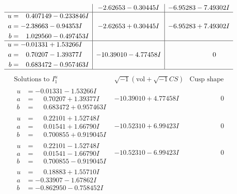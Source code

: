 \documentclass[1p]{elsarticle_modified}
\theoremstyle{definition}
\newcommand{\I}{\sqrt{-1}}
\begin{document}
$$\begin{array}{c|c|c}
 & -2.62653 - 0.30445 I & -6.95283 - 7.49302 I \\ \hline\begin{aligned}
u &= \phantom{-}0.407149 - 0.233846 I \\
a &= -2.38663 - 0.94353 I \\
b &= \phantom{-}1.029560 - 0.497453 I\end{aligned}
 & -2.62653 + 0.30445 I & -6.95283 + 7.49302 I \\ \hline\begin{aligned}
u &= -0.01331 + 1.53266 I \\
a &= \phantom{-}0.70207 - 1.39377 I \\
b &= \phantom{-}0.683472 - 0.957463 I\end{aligned}
 & -10.39010 - 4.77458 I & \phantom{-0.000000 } 0\\
 \hline 
 \end{array}$$\newpage$$\begin{array}{c|c|c}  
\text{Solutions to }I^u_{1}& \I (\text{vol} + \sqrt{-1}CS) & \text{Cusp shape}\\
 \hline 
\begin{aligned}
u &= -0.01331 - 1.53266 I \\
a &= \phantom{-}0.70207 + 1.39377 I \\
b &= \phantom{-}0.683472 + 0.957463 I\end{aligned}
 & -10.39010 + 4.77458 I & \phantom{-0.000000 } 0 \\ \hline\begin{aligned}
u &= \phantom{-}0.22101 + 1.52748 I \\
a &= \phantom{-}0.01541 + 1.66790 I \\
b &= \phantom{-}0.700855 + 0.919045 I\end{aligned}
 & -10.52310 + 6.99423 I & \phantom{-0.000000 } 0 \\ \hline\begin{aligned}
u &= \phantom{-}0.22101 - 1.52748 I \\
a &= \phantom{-}0.01541 - 1.66790 I \\
b &= \phantom{-}0.700855 - 0.919045 I\end{aligned}
 & -10.52310 - 6.99423 I & \phantom{-0.000000 } 0 \\ \hline\begin{aligned}
u &= \phantom{-}0.18883 + 1.55710 I \\
a &= -0.33907 - 1.67862 I \\
b &= -0.862950 - 0.758452 I\end{aligned}

\end{array}$$
\end{document}
